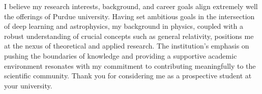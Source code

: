 \documentclass{article}
\begin{document}
I believe my research interests, background, and career goals align extremely
well the offerings of Purdue university. Having set ambitious goals in the
intersection of deep learning and astrophysics, my background in physics,
coupled with a robust understanding of crucial concepts such as general
relativity, positions me at the nexus of theoretical and applied research. The
institution's emphasis on pushing the boundaries of knowledge and providing a
supportive academic environment resonates with my commitment to contributing
meaningfully to the scientific community. Thank you for considering me as a
prospective student at your university.



\end{document}
